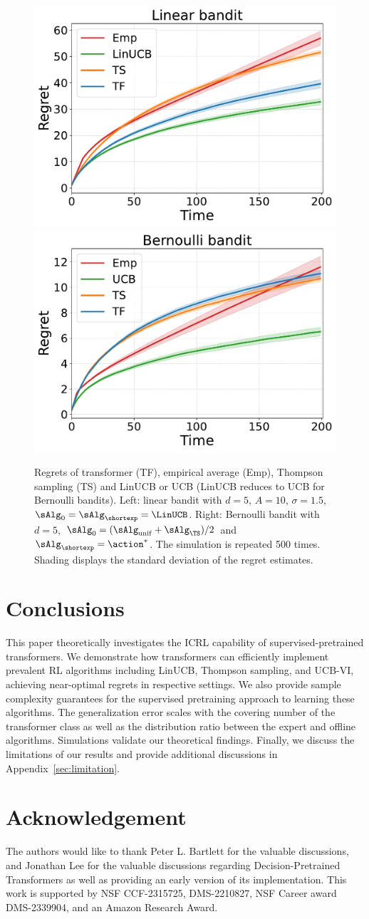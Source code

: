 \documentclass[10pt]{article}
\begin{document}
\begin{figure}[t]
\centering  %
\includegraphics[width=0.35\linewidth]{Sections/figs/record_2_cum_True.pdf}
\hspace{2em}
\includegraphics[width=0.35\linewidth]{Sections/figs/record_1_cum_True.pdf}
\vspace{-1em}
\caption{Regrets of transformer (TF), empirical average (Emp), Thompson sampling (TS) and LinUCB or UCB (LinUCB reduces to UCB for Bernoulli bandits). Left: linear bandit with $d=5$, $A=10$, $\sigma=1.5$, $\sAlg_0=\sAlg_\shortexp=\LinUCB$. Right: Bernoulli bandit with $d=5$, $\sAlg_0=(\sAlg_{\mathrm{unif}}+\sAlg_{\TS})/2$ and $\sAlg_\shortexp=\action^*$. The simulation is repeated 500 times. Shading displays the standard deviation of the regret estimates. }
\label{fig:regret_1}
\end{figure}


\section{Conclusions}

This paper theoretically investigates the ICRL capability of supervised-pretrained transformers. We demonstrate how transformers can efficiently implement prevalent RL algorithms including LinUCB, Thompson sampling, and UCB-VI, achieving near-optimal regrets in respective settings. We also provide sample complexity guarantees for the supervised pretraining approach to learning these algorithms. The generalization error scales with the covering number of the transformer class as well as the distribution ratio between the expert and offline algorithms. Simulations validate our theoretical findings.
Finally, we discuss the limitations of our results and provide additional discussions in Appendix~\ref{sec:limitation}.





\section*{Acknowledgement}

The authors would like to thank Peter L. Bartlett for the valuable discussions, and Jonathan Lee for the valuable discussions regarding Decision-Pretrained Transformers as well as providing an early version of its implementation. This work is supported by NSF CCF-2315725, DMS-2210827, NSF Career award DMS-2339904, and an Amazon Research Award.


\end{document}
